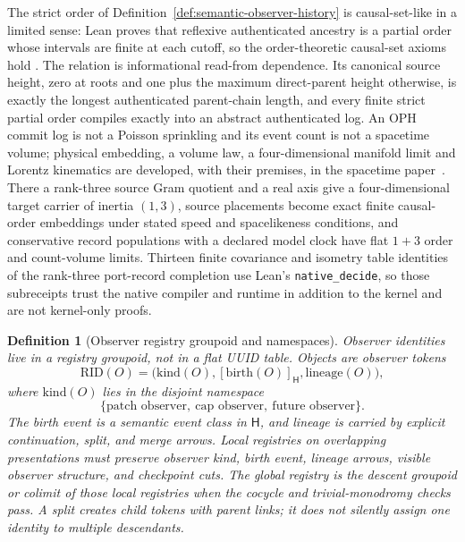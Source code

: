 \documentclass[11pt]{article}
\newtheorem{definition}[theorem]{Definition}
\begin{document}
The strict order of Definition~\ref{def:semantic-observer-history} is
causal-set-like in a limited sense: Lean proves that reflexive authenticated
ancestry is a partial order whose intervals are finite at each cutoff, so the
order-theoretic causal-set axioms hold \cite{bombelli1987,surya2019}. The
relation is informational read-from dependence. Its canonical source height,
zero at roots and one plus the maximum direct-parent height otherwise, is
exactly the longest authenticated parent-chain length, and every finite
strict partial order compiles exactly into an abstract authenticated log. An
OPH commit log is not a Poisson sprinkling and its event count is not a
spacetime volume; physical embedding, a volume law, a four-dimensional
manifold limit and Lorentz kinematics are developed, with their premises, in
the spacetime paper~\cite{ophEinstein}. There a rank-three source Gram
quotient and a real axis give a four-dimensional target carrier of inertia
\((1,3)\), source placements become exact finite causal-order embeddings under
stated speed and spacelikeness conditions, and conservative record populations
with a declared model clock have flat \(1+3\) order and count-volume limits. Thirteen finite covariance and isometry table identities of the
rank-three port-record completion use Lean's \texttt{native\_decide}, so those
subreceipts trust the native compiler and runtime in addition to the kernel
and are not kernel-only proofs.

\begin{definition}[Observer registry groupoid and namespaces]\label{def:observer-registry-groupoid}
Observer identities live in a registry groupoid, not in a flat UUID table. Objects are observer
tokens
\[
\mathrm{RID}(O)=\bigl(\mathrm{kind}(O),[\mathrm{birth}(O)]_{\mathsf H},\mathrm{lineage}(O)\bigr),
\]
where \(\mathrm{kind}(O)\) lies in the disjoint namespace
\[
\{\text{patch observer},\ \text{cap observer},\ \text{future observer}\}.
\]
The birth event is a semantic event class in \(\mathsf H\), and lineage is carried by explicit
continuation, split, and merge arrows. Local registries on overlapping presentations must preserve
observer kind, birth event, lineage arrows, visible observer structure, and checkpoint cuts. The
global registry is the descent groupoid or colimit of those local registries when the cocycle and
trivial-monodromy checks pass. A split creates child tokens with parent links; it does not silently
assign one identity to multiple descendants.
\end{definition}
\end{document}
